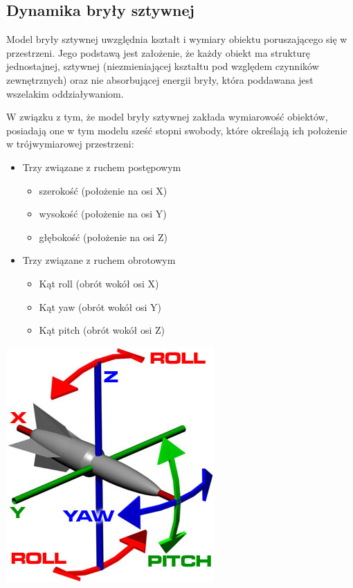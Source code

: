\subsection{Dynamika bryły sztywnej}
\par{
Model bryły sztywnej uwzględnia kształt i wymiary obiektu poruszającego się w przestrzeni. Jego podstawą jest założenie, że każdy obiekt ma strukturę jednostajnej, sztywnej (niezmieniającej kształtu pod względem czynników zewnętrznych) oraz nie absorbującej energii bryły, która poddawana jest wszelakim oddziaływaniom.
}
\par{
W związku z tym, że model bryły sztywnej zakłada wymiarowość obiektów, posiadają one w tym modelu sześć stopni swobody, które określają ich położenie w trójwymiarowej przestrzeni:
\begin{itemize}
\item Trzy związane z ruchem postępowym
	\begin{itemize}
	\item szerokość (położenie na osi X)
	\item wysokość (położenie na osi Y)
	\item głębokość (położenie na osi Z)
	\end{itemize}
\item Trzy związane z ruchem obrotowym
	\begin{itemize}
	\item Kąt roll (obrót wokół osi X)
	\item Kąt yaw (obrót wokół osi Y)
	\item Kąt pitch (obrót wokół osi Z)
	\end{itemize}
\end{itemize}
}
\par{
\begin{center}
\includegraphics[]{img/xyz_ryp}
\end{center}
}
